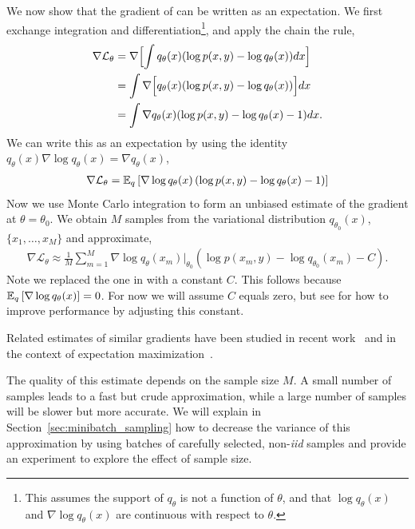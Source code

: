 We now show that the gradient of
 can be written
as an expectation.  We first exchange integration and
differentiation\footnote{This assumes the support of $q_\theta$ is not
  a function of $\theta$, and that $\log q_\theta(x)$ and $\nabla \log
  q_\theta(x)$ are continuous with respect to $\theta$.}, and apply
the chain the rule,
\begin{align}
 \nabla \mathcal{L}_\theta &= \nabla \Bigl[
  \int q_{\theta}(x) (\log p(x, y) - \log q_{\theta}(x))
  dx \Bigr] \\ \nonumber
  & = \int \nabla \Bigl[ q_{\theta}(x) (\log p(x, y) - \log
     q_{\theta}(x)) \Bigr] dx  \\ \nonumber
     &= \int \nabla q_{\theta}(x) (
     \log p(x, y) - \log q_{\theta}(x) - 1) dx.
\end{align}
We can write this as an expectation by using the identity
$q_\theta(x) \nabla \log q_\theta(x) = \nabla q_\theta(x)$,
\begin{align}
  \label{eq:gradient-as-expectation}
  \nabla \mathcal{L}_\theta =
  \mathbb{E}_q\left[\nabla \log q_\theta(x) \left(\log p(x,y) - \log
      q_{\theta}(x) - 1 \right)\right]
\end{align}
Now we use Monte Carlo integration to form an unbiased estimate of the
gradient at $\theta = \theta_0$.  We obtain $M$ samples from the
variational distribution $q_{\theta_0}(x)$, $\{x_{1}, \ldots, x_{M}\}$
and approximate,
\begin{align}
  \label{eq:svo_gradient}
  \nabla \mathcal{L}_\theta \approx \frac{1}{M} \sum_{m=1}^M
  \nabla \log q_{\theta}(x_{m}) \Bigr|_{\theta_0}
  (\log p(x_{m} , y) - \log q_{\theta_0}(x_{m}) - C).
\end{align}
Note we replaced the one in  with a
constant $C$.  This follows because $\mathbb{E}_q\left[\nabla \log q_\theta(x)\right]
= 0$.  For now we will assume $C$ equals zero, but see
 for how to improve performance by adjusting this
constant.

Related estimates of similar gradients have been studied in
recent work~\citep{carbonetto:2009,graves:2011} and in the context of
expectation maximization~\citep{wei:1990}.

The quality of this estimate depends on the sample size $M$.  A small
number of samples leads to a fast but crude approximation, while a
large number of samples will be slower but more accurate.  We will
explain in Section~\ref{sec:minibatch_sampling} how to decrease
the variance of this approximation by using batches of carefully
selected, non-\emph{iid} samples and provide an experiment to explore
the effect of sample size.


